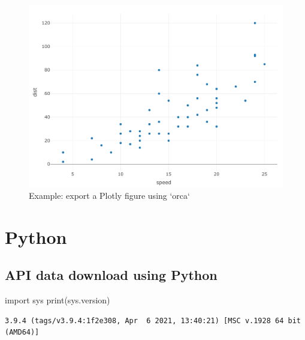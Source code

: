 \documentclass[
  12pt,
]{article}
\newenvironment{Shaded}{\begin{snugshade}}{\end{snugshade}}
\newcommand{\BuiltInTok}[1]{#1}
\newcommand{\ImportTok}[1]{#1}
\newcommand{\NormalTok}[1]{#1}
\begin{document}
\begin{figure}[ht]
\centering
\caption{Example: export a Plotly figure using `orca`}\label{fig:fig-3}
        \includegraphics[width=0.9\linewidth]{logs/plotly-plot.pdf}
\begin{flushleft}
\end{flushleft}
\end{figure}
\vspace{-1.2cm}

\hypertarget{python}{%
\section{Python}\label{python}}

\hypertarget{api-data-download-using-python}{%
\subsection{API data download using Python}\label{api-data-download-using-python}}

\begin{Shaded}
\begin{Highlighting}[]
\ImportTok{import}\NormalTok{ sys}
\BuiltInTok{print}\NormalTok{(sys.version)}
\end{Highlighting}
\end{Shaded}

\begin{verbatim}
3.9.4 (tags/v3.9.4:1f2e308, Apr  6 2021, 13:40:21) [MSC v.1928 64 bit (AMD64)]
\end{verbatim}
\end{document}
